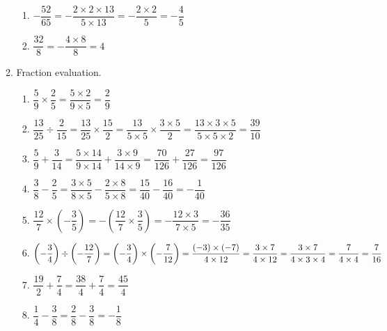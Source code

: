 \documentclass[fleqn]{article}
\begin{document}
\begin{enumerate}[label=\textbf{\arabic*.},labelsep=2em]
\begin{enumerate}[label=\textbf{\arabic*.},labelsep=2em]
\begin{enumerate}[label=\textbf{(\alph*)},labelsep=2em]
\item $ -\dfrac{52}{65} = -\dfrac{2 \times 2 \times 13}{5 \times 13} = -\dfrac{2 \times 2}{5} = -\dfrac{4}{5} $

\item $ \dfrac{32}{8} = -\dfrac{4 \times 8}{8} = 4 $

\end{enumerate}

\item
Fraction evaluation.

\begin{enumerate}[label=\textbf{(\alph*)},labelsep=2em]

\item 
$ 
	\dfrac{5}{9} \times \dfrac{2}{5} = 
	\dfrac{5 \times 2}{ 9 \times 5} = 
	\dfrac{2}{9}
$

\item 
$ 
	\dfrac{13}{25} \div \dfrac{2}{15} = 
	\dfrac{13}{25} \times \dfrac{15}{2} =
	\dfrac{13}{5 \times 5} \times \dfrac{3 \times 5}{2} = 
	\dfrac{13 \times 3 \times 5}{5 \times 5 \times 2} = 
	\dfrac{39}{10}
$

\item
$
	\dfrac{5}{9} + \dfrac{3}{14} =
	\dfrac{5 \times 14}{9 \times 14} + \dfrac{3 \times 9}{14 \times 9} =
	\dfrac{70}{126} + \dfrac{27}{126} =
	\dfrac{97}{126}
$

\item
$
	\dfrac{3}{8} - \dfrac{2}{5} =
	\dfrac{3 \times 5}{8 \times 5} - \dfrac{2 \times 8}{5 \times 8}=
	\dfrac{15}{40} - \dfrac{16}{40} =
	- \dfrac{1}{40}
$

\item
$
	\dfrac{12}{7} \times \left( - \dfrac{3}{5} \right) =
	- \left( \dfrac{12}{7} \times \dfrac{3}{5} \right) =
	- \dfrac{12 \times 3}{7 \times 5} =
	- \dfrac{36}{35}
$

\item
$
	\left( -\dfrac{3}{4} \right) \div \left( -\dfrac{12}{7} \right) =
	\left( -\dfrac{3}{4} \right) \times \left( -\dfrac{7}{12} \right) =
	\dfrac {(-3) \times (-7)}{4 \times 12} =
	\dfrac {3 \times 7}{4 \times 12} = \\[8pt]
	\dfrac{3 \times 7}{4 \times 3 \times 4} = 
	\dfrac{7}{4 \times 4} =
	\dfrac{7}{16}
$

\item
$
	\dfrac{19}{2} + \dfrac{7}{4} =
	\dfrac{38}{4} + \dfrac{7}{4} =
	\dfrac{45}{4}
$

\item
$
	\dfrac{1}{4} - \dfrac{3}{8} =
	\dfrac{2}{8} - \dfrac{3}{8} =
	-\dfrac{1}{8}
$

\end{enumerate}

\end{enumerate} %

\end{enumerate}
\end{document}

